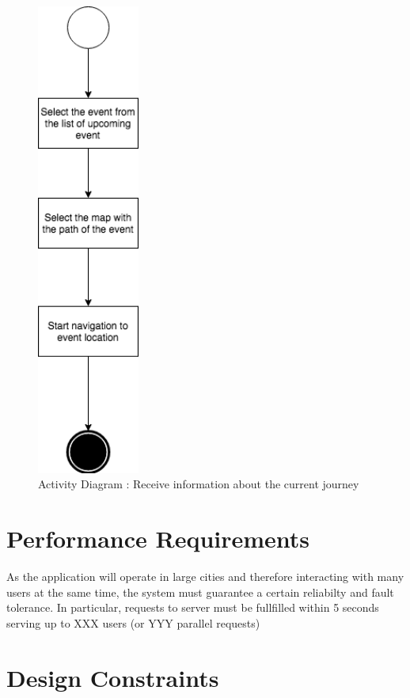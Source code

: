 \documentclass[numbers=noenddot, 12pt, a4paper, oneside]{scrbook}
\begin{document}
\newpage

\begin{figure}[H]
	\centering
	\includegraphics[width=0.3\textwidth]{flows/Scenario9}
	\caption{Activity Diagram : Receive information about the current journey}
\end{figure}
\newpage
\section{Performance Requirements}

As the application will operate in large cities and therefore interacting with many users at the same time, the system must guarantee a certain reliabilty and fault tolerance. In particular, requests to server must be fullfilled within 5 seconds serving up to XXX users (or YYY parallel requests)

\section{Design Constraints}
\end{document}
